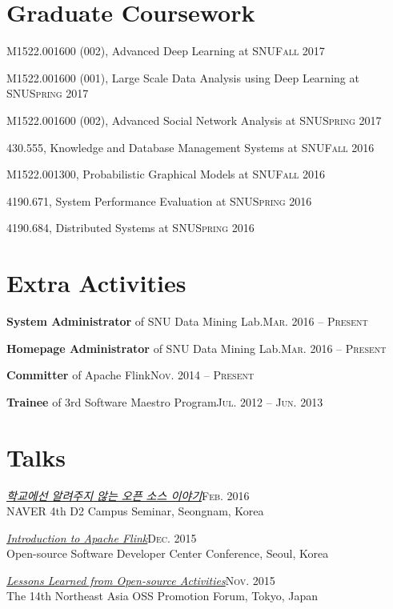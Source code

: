 \documentclass[11pt,a4paper]{article}
\renewenvironment{itemize}{
  \begin{list}{}{
    \setlength{\leftmargin}{1.5em}
    \setlength{\itemsep}{0.5em}
    \setlength{\parskip}{0pt}
    \setlength{\parsep}{0.25em}
  }
}{
  \end{list}
}
\begin{document}
\section*{Graduate Coursework}
\begin{itemize}
	\setlength\itemsep{0.1em}
  \item M1522.001600 (002), Advanced Deep Learning at SNU\hfill\textsc{Fall 2017}
	\item M1522.001600 (001), Large Scale Data Analysis using Deep Learning at SNU\hfill\textsc{Spring 2017}
	\item M1522.001600 (002), Advanced Social Network Analysis at SNU\hfill\textsc{Spring 2017}
	\item 430.555, Knowledge and Database Management Systems at SNU\hfill\textsc{Fall 2016}
	\item M1522.001300, Probabilistic Graphical Models at SNU\hfill\textsc{Fall 2016}
	\item 4190.671, System Performance Evaluation at SNU\hfill\textsc{Spring 2016}
	\item 4190.684, Distributed Systems at SNU\hfill\textsc{Spring 2016}
\end{itemize}

\section*{Extra Activities}
\begin{itemize}
	\setlength\itemsep{0.1em}
  \item \textbf{System Administrator} of SNU Data Mining Lab.\hfill\textsc{Mar. 2016 -- Present}
  \item \textbf{Homepage Administrator} of SNU Data Mining Lab.\hfill\textsc{Mar. 2016 -- Present}
  \item \textbf{Committer} of Apache Flink\hfill\textsc{Nov. 2014 -- Present}
  \item \textbf{Trainee} of 3rd Software Maestro Program\hfill\textsc{Jul. 2012 -- Jun. 2013}
\end{itemize}

\section*{Talks}
\begin{itemize}
  \item \href{http://j.mp/d2-campus-seminar-4th-park}{\textit{학교에선 알려주지 않는 오픈 소스 이야기}}\hfill\textsc{Feb. 2016}\\
        NAVER 4th D2 Campus Seminar, Seongnam, Korea
  \item \href{http://j.mp/ossdevconf-2015-park}{\textit{Introduction to Apache Flink}}\hfill\textsc{Dec. 2015}\\
        Open-source Software Developer Center Conference, Seoul, Korea
  \item \href{http://j.mp/cjkossforum-2015-park}{\textit{Lessons Learned from Open-source Activities}}\hfill\textsc{Nov. 2015}\\
        The 14th Northeast Asia OSS Promotion Forum, Tokyo, Japan
\end{itemize}
\end{document}

